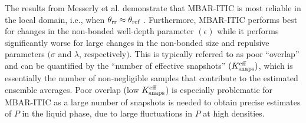 \documentclass[journal=jced,manuscript=article]{achemso}
\begin{document}




The results from Messerly et al. demonstrate that MBAR-ITIC is most reliable in the local domain, i.e., when $\theta_{\rm rr} \approx \theta_{\rm ref}$ \cite{Postdoc_1}. Furthermore, MBAR-ITIC performs best for changes in the non-bonded well-depth parameter $(\epsilon)$ while it performs significantly worse for large changes in the non-bonded size and repulsive parameters $(\sigma$ and $\lambda$, respectively$)$. This is typically referred to as poor ``overlap'' and can be quantified by the ``number of effective snapshots'' $(K^{\rm eff}_{\rm snaps})$, which is essentially the number of non-negligible samples that contribute to the estimated ensemble averages. Poor overlap (low $K^{\rm eff}_{\rm snaps}$) is especially problematic for MBAR-ITIC as a large number of snapshots is needed to obtain precise estimates of $P$ in the liquid phase, due to large fluctuations in $P$ at high densities.


\end{document}
